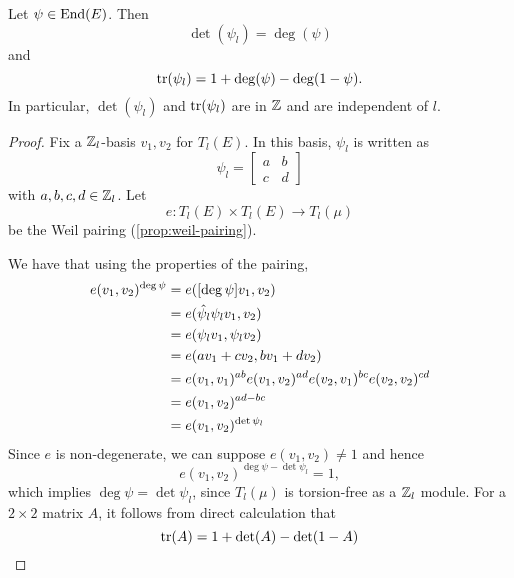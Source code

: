 

\begin{proposition}
	\label{prop:deg-tr-det}
	Let $\psi \in \operatorname{End}(E)$. Then
	\begin{equation*}
		\det(\psi_l) = \deg(\psi)
	\end{equation*}
	and
	\begin{equation*}
		\operatorname{tr}(\psi_l) = 1 + \deg(\psi) - \deg(1 - \psi).
	\end{equation*}
	In particular, $\det(\psi_l)$ and $\operatorname{tr}(\psi_l)$ are in $\mathbb{Z}$
	and are independent of $l$.
\end{proposition}

\begin{proof}
	Fix a $\mathbb{Z}_l$-basis $v_1, v_2$ for $T_l(E)$. In this basis, $\psi_l$ is
	written as 
	\begin{equation*}
		\psi_l = 
		\begin{bmatrix}
			a & b\\
			c & d
		\end{bmatrix}
	\end{equation*}
	with $a, b, c, d \in \mathbb{Z}_l$.
	Let
	\begin{equation*}
		e: T_l(E) \times T_l(E) \to T_l(\mu)
	\end{equation*}
	be the Weil pairing (\ref{prop:weil-pairing}).

	We have that using the properties of the pairing,
	\begin{align*}
		e(v_1, v_2)^{\deg\psi} &= e([\deg \psi] v_1, v_2)\\
		&= e(\Hat\psi_l\psi_l v_1, v_2)\\
		&= e(\psi_l v_1, \psi_l v_2)\\
		&= e(av_1 + cv_2, bv_1 + dv_2)\\
		&= e(v_1, v_1)^{ab}e(v_1, v_2)^{ad}e(v_2, v_1)^{bc}e(v_2, v_2)^{cd}\\
		&= e(v_1, v_2)^{ad - bc}\\
		&= e(v_1, v_2)^{\det \psi_l}
	\end{align*}
	Since $e$ is non-degenerate, we can suppose $e(v_1, v_2) \neq 1$
	and hence
	\begin{equation*}
		e(v_1, v_2)^{\deg\psi - \det\psi_l} = 1,
	\end{equation*}
	which implies $\deg\psi = \det \psi_l$, since $T_l(\mu)$ is torsion-free
	as a $\mathbb{Z}_l$ module.
	For a $2\times 2$ matrix $A$, it follows from direct calculation that
	\begin{equation*}
		\operatorname{tr}(A) = 1 + \det(A) - \det(1-A)
	\end{equation*}
\end{proof}
